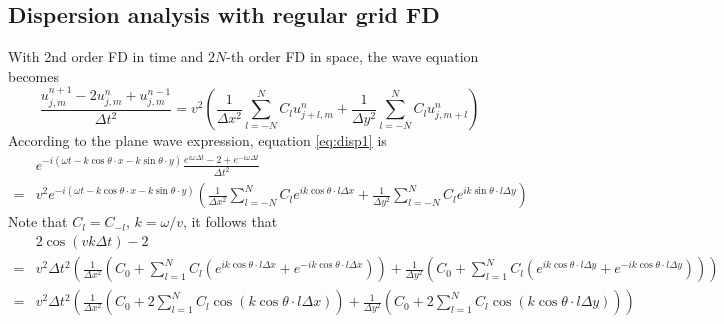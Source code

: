 \subsection{Dispersion analysis with regular grid FD \cite{liu2009new}}
With 2nd order FD in time and $2N$-th order FD in space, the wave equation becomes
\begin{equation}\label{eq:disp1}
\frac{u_{j,m}^{n+1}-2u_{j,m}^n+u_{j,m}^{n-1}}{\Delta t^2}
=v^2\left(\frac{1}{\Delta x^2}\sum_{l=-N}^{N}C_l u_{j+l,m}^n+
 \frac{1}{\Delta y^2}\sum_{l=-N}^{N}C_l u_{j,m+l}^n\right)
\end{equation}
According to the plane wave expression, equation \eqref{eq:disp1} is
\begin{equation}
\begin{split}
&e^{-i(\omega t- k\cos\theta \cdot x- k\sin\theta\cdot y)}\frac{e^{i\omega\Delta t}-2+e^{-i\omega\Delta t}}{\Delta t^2}\\
=&v^2 e^{-i(\omega t- k\cos\theta\cdot x- k\sin\theta\cdot y)}\left(
\frac{1}{\Delta x^2}\sum_{l=-N}^{N}C_l e^{i k\cos\theta \cdot l\Delta x}
+\frac{1}{\Delta y^2}\sum_{l=-N}^{N}C_l e^{i k\sin\theta \cdot l\Delta y}
\right)
\end{split}
\end{equation}
Note that $C_l=C_{-l}$, $k=\omega/v$, it follows that
\begin{equation}\label{eq:disp2}
\begin{split}
 &2\cos( v k\Delta t)-2\\
 =&v^2\Delta t^2 \left(
\frac{1}{\Delta x^2}(C_0+\sum_{l=1}^{N}C_l (e^{i k\cos\theta \cdot l\Delta x}+e^{-i k\cos\theta \cdot l\Delta x}))
+\frac{1}{\Delta y^2}(C_0+\sum_{l=1}^{N}C_l (e^{i k\cos\theta \cdot l\Delta y}+e^{-i k\cos\theta \cdot l\Delta y}))
\right)\\
 =&v^2\Delta t^2 \left(
\frac{1}{\Delta x^2}(C_0+2\sum_{l=1}^{N}C_l \cos(k\cos\theta \cdot l\Delta x))+
\frac{1}{\Delta y^2}(C_0+2\sum_{l=1}^{N}C_l \cos(k\cos\theta \cdot l\Delta y))
\right)\\
\end{split}
\end{equation}

